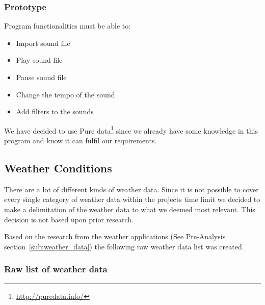 
\pagebreak
\subsubsection{Prototype} %
\label{ssub:prototype}

Program functionalities must be able to:
\begin{itemize}
    \item Import sound file
    \item Play sound file
    \item Pause sound file
    \item Change the tempo of the sound
    \item Add filters to the sounds
\end{itemize}

We have decided to use Pure data\footnote{\url{http://puredata.info/}} since we already have some knowledge in this program and know it can fulfil our requirements. 




\subsection{Weather Conditions} %
\label{sub:weather_conditions}

There are a lot of different kinds of weather data. 
Since it is not possible to cover every single category of weather data within the projects time limit we decided to make a delimitation of the weather data to what we deemed most relevant. This decision is not based upon prior research.

Based on the research from the weather applications (See Pre-Analysis section~\ref{sub:weather_data}) the following raw weather data list was created.

\subsubsection*{Raw list of weather data} %
\label{ssub:raw_list_of_weather_data}

